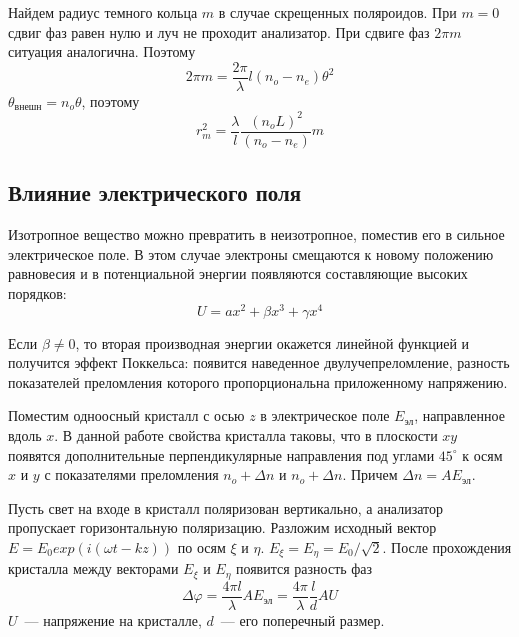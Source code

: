 Найдем радиус темного кольца $m$ в случае скрещенных поляроидов. При $m = 0$ сдвиг фаз равен нулю и луч не проходит анализатор. При сдвиге фаз $2\pi m$ ситуация аналогична. Поэтому
\[
    2\pi m = \frac{2\pi}{\lambda} l \left(n_{o} - n_{e}\right) \theta^{2}
\]
$\theta_{\text{внешн}} = n_{o}\theta$, поэтому
\[
    r_{m}^{2} = \frac{\lambda}{l} \frac{\left(n_{o}L\right)^{2}}{\left(n_{o} - n_{e}\right)} m
\]

\subsection{Влияние электрического поля}
Изотропное вещество можно превратить в неизотропное, поместив его в сильное электрическое поле. В этом случае электроны смещаются к новому положению равновесия и в потенциальной энергии появляются составляющие высоких порядков:
\[
    U = ax^{2} + \beta x^{3} + \gamma x^{4}
\]

Если $\beta \ne 0$, то вторая производная энергии окажется линейной функцией и получится эффект Поккельса: появится наведенное двулучепреломление, разность показателей преломления которого пропорциональна приложенному напряжению.

\begin{figure}[ht!]
\end{figure}

Поместим одноосный кристалл с осью $z$ в электрическое поле $E_{\text{эл}}$, направленное вдоль $x$. В данной работе свойства кристалла таковы, что в плоскости $xy$ появятся дополнительные перпендикулярные направления под углами $45^{\circ}$ к осям $x$ и $y$ с показателями преломления $n_{o} + \Delta n$ и $n_{o} + \Delta n$. Причем $\Delta n = A E_{\text{эл}}$. 

Пусть свет на входе в кристалл поляризован вертикально, а анализатор пропускает горизонтальную поляризацию. Разложим исходный вектор $E = E_{0} exp{\left(i\left(\omega t - kz\right)\right)}$ по осям $\xi$ и $\eta$. $E_{\xi} = E_{\eta} = E_{0} / \sqrt{2}$. После прохождения кристалла между векторами $E_{\xi}$ и $E_{\eta}$ появится разность фаз
\[
    \Delta \varphi = \frac{4\pi l}{\lambda}AE_{\text{эл}} = \frac{4\pi}{\lambda}\frac{l}{d}AU
\]
$U$~--- напряжение на кристалле, $d$~--- его поперечный размер.

